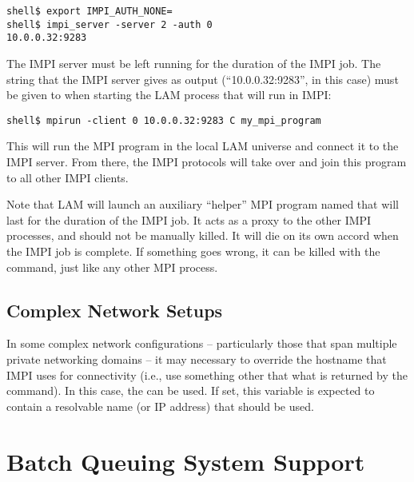 \lstset{style=lam-cmdline}
\begin{lstlisting}
shell$ export IMPI_AUTH_NONE=
shell$ impi_server -server 2 -auth 0
10.0.0.32:9283
\end{lstlisting}

The IMPI server must be left running for the duration of the IMPI job.
%
The string that the IMPI server gives as output (``10.0.0.32:9283'',
in this case) must be given to  when starting the LAM
process that will run in IMPI:

\lstset{style=lam-cmdline}
\begin{lstlisting}
shell$ mpirun -client 0 10.0.0.32:9283 C my_mpi_program
\end{lstlisting}

This will run the MPI program in the local LAM universe and connect it
to the IMPI server.  From there, the IMPI protocols will take over and
join this program to all other IMPI clients.

Note that LAM will launch an auxiliary ``helper'' MPI program named
 that will last for the duration of the IMPI job.  It acts
as a proxy to the other IMPI processes, and should not be manually
killed.  It will die on its own accord when the IMPI job is complete.
If something goes wrong, it can be killed with the 
command, just like any other MPI process.


\subsection{Complex Network Setups}

In some complex network configurations -- particularly those that span
multiple private networking domains -- it may necessary to override
the hostname that IMPI uses for connectivity (i.e., use something
other that what is returned by the  command).  In this
case, the  can be used.  If set, this
variable is expected to contain a resolvable name (or IP address) that
should be used.


\section{Batch Queuing System Support}
\label{sec:misc-batch}

